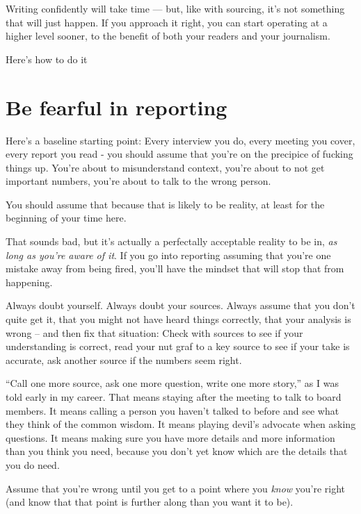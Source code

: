 \documentclass[
  11pt,
  american,
  letterpaperpaper,
  extrafontsizes,onecolumn,openright
  ]{memoir}
\newlength{\rf}
\begin{document}
Writing confidently will take time --- but, like with sourcing, it's not something that will just happen. If you approach it right, you can start operating at a higher level sooner, to the benefit of both your readers and your journalism.

Here's how to do it

\hypertarget{be-fearful-in-reporting}{%
\section*{Be fearful in reporting}\label{be-fearful-in-reporting}}

Here's a baseline starting point: Every interview you do, every meeting you cover, every report you read - you should assume that you're on the precipice of fucking things up. You're about to misunderstand context, you're about to not get important numbers, you're about to talk to the wrong person.

You should assume that because that is likely to be reality, at least for the beginning of your time here.

That sounds bad, but it's actually a perfectally acceptable reality to be in, \emph{as long as you're aware of it}. If you go into reporting assuming that you're one mistake away from being fired, you'll have the mindset that will stop that from happening.

Always doubt yourself. Always doubt your sources. Always assume that you don't quite get it, that you might not have heard things correctly, that your analysis is wrong -- and then fix that situation: Check with sources to see if your understanding is correct, read your nut graf to a key source to see if your take is accurate, ask another source if the numbers seem right.

\enquote{Call one more source, ask one more question, write one more story,} as I was told early in my career. That means staying after the meeting to talk to board members. It means calling a person you haven't talked to before and see what they think of the common wisdom. It means playing devil's advocate when asking questions. It means making sure you have more details and more information than you think you need, because you don't yet know which are the details that you do need.

Assume that you're wrong until you get to a point where you \emph{know} you're right (and know that that point is further along than you want it to be).
\end{document}
